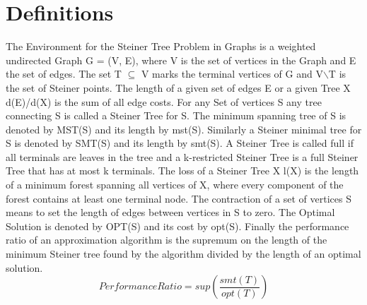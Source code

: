 \section{Definitions}
The Environment for the Steiner Tree Problem in Graphs is a weighted undirected Graph G = (V, E), where V is the set of vertices in the Graph and E the set of edges. The set T $ \subseteq$ V marks the terminal vertices of G and V$\backslash$T is the set of Steiner points. The length of a given set of edges E or a given Tree X d(E)/d(X) is the sum of all edge costs. For any Set of vertices S any tree connecting S is called a Steiner Tree for S. The minimum spanning tree of S is denoted by MST(S) and its length by mst(S). Similarly a Steiner minimal tree for S is denoted by SMT(S) and its length by smt(S). A Steiner Tree is called full if all terminals are leaves in the tree and a k-restricted Steiner Tree is a full Steiner Tree that has at most k terminals. The loss of a Steiner Tree X l(X) is the length of a minimum forest spanning all vertices of X, where every component of the forest contains at least one terminal node. The contraction of a set of vertices S means to set the length of edges between vertices in S to zero. The Optimal Solution is denoted by OPT(S) and its cost by opt(S). Finally the performance ratio of an approximation algorithm is the supremum on the length of the minimum Steiner tree found by the algorithm divided by the length of an optimal solution.
\begin{equation} 
  Performance Ratio=sup(\frac{smt(T)}{opt(T)})
\end{equation}

